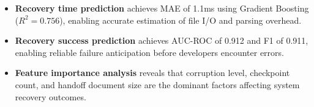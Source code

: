 \begin{itemize}
    \item \textbf{Recovery time prediction} achieves MAE of 1.1ms using Gradient Boosting ($R^2 = 0.756$), enabling accurate estimation of file I/O and parsing overhead.
    \item \textbf{Recovery success prediction} achieves AUC-ROC of 0.912 and F1 of 0.911, enabling reliable failure anticipation before developers encounter errors.
    \item \textbf{Feature importance analysis} reveals that corruption level, checkpoint count, and handoff document size are the dominant factors affecting system recovery outcomes.
\end{itemize}
